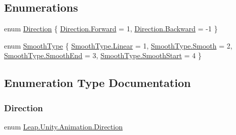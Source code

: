 \subsection*{Enumerations}
\begin{DoxyCompactItemize}
\item 
enum \mbox{\hyperlink{namespace_leap_1_1_unity_1_1_animation_ab080d4756e4d3d6a2fc9cd9a7f4e695a}{Direction}} \{ \mbox{\hyperlink{namespace_leap_1_1_unity_1_1_animation_ab080d4756e4d3d6a2fc9cd9a7f4e695aa67d2f6740a8eaebf4d5c6f79be8da481}{Direction.\+Forward}} = 1, 
\mbox{\hyperlink{namespace_leap_1_1_unity_1_1_animation_ab080d4756e4d3d6a2fc9cd9a7f4e695aab3263eb38f8903efc271cc7a760da510}{Direction.\+Backward}} = -\/1
 \}
\item 
enum \mbox{\hyperlink{namespace_leap_1_1_unity_1_1_animation_a9667bc3fe4218574cb25efb892505c77}{Smooth\+Type}} \{ \mbox{\hyperlink{namespace_leap_1_1_unity_1_1_animation_a9667bc3fe4218574cb25efb892505c77a32a843da6ea40ab3b17a3421ccdf671b}{Smooth\+Type.\+Linear}} = 1, 
\mbox{\hyperlink{namespace_leap_1_1_unity_1_1_animation_a9667bc3fe4218574cb25efb892505c77ae510cdf33cd497134b47b9316314d4b4}{Smooth\+Type.\+Smooth}} = 2, 
\mbox{\hyperlink{namespace_leap_1_1_unity_1_1_animation_a9667bc3fe4218574cb25efb892505c77a2eb1af4bef4f9caa615376e099eb8db0}{Smooth\+Type.\+Smooth\+End}} = 3, 
\mbox{\hyperlink{namespace_leap_1_1_unity_1_1_animation_a9667bc3fe4218574cb25efb892505c77a3795f58832aa758253885990b7cb544d}{Smooth\+Type.\+Smooth\+Start}} = 4
 \}
\end{DoxyCompactItemize}


\subsection{Enumeration Type Documentation}
\mbox{\label{namespace_leap_1_1_unity_1_1_animation_ab080d4756e4d3d6a2fc9cd9a7f4e695a}} 
\subsubsection{\texorpdfstring{Direction}{Direction}}
{\footnotesize\ttfamily enum \mbox{\hyperlink{namespace_leap_1_1_unity_1_1_animation_ab080d4756e4d3d6a2fc9cd9a7f4e695a}{Leap.\+Unity.\+Animation.\+Direction}}\hspace{0.3cm}{\ttfamily [strong]}}

